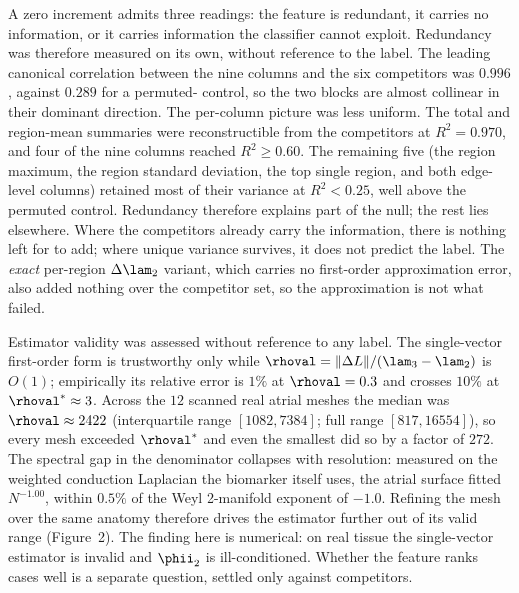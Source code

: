 A zero increment admits three readings: the feature is redundant, it carries no
information, or it carries information the classifier cannot exploit. Redundancy
was therefore measured on its own, without reference to the label. The leading canonical
correlation between the nine \SFI{} columns and the six competitors was $0.996$,
against $0.289$ for a permuted-\SFI{} control, so the two blocks are almost
collinear in their dominant direction. The per-column picture was less uniform.
The total and region-mean summaries were reconstructible from the competitors at
$R^{2}=0.970$, and four of the nine columns reached $R^{2}\geq0.60$. The
remaining five (the region maximum, the region standard deviation, the top
single region, and both edge-level columns) retained most of their variance at
$R^{2}<0.25$, well above the permuted control. Redundancy therefore explains
part of the null; the rest lies elsewhere. Where the competitors already carry
the information, there is nothing left for \SFI{} to add; where unique variance
survives, it does not predict the label. The \emph{exact} per-region
$\Delta\lam_2$ variant, which carries no first-order approximation error, also
added nothing over the competitor set, so the approximation is not what failed.

Estimator validity was assessed without reference to any label. The
single-vector first-order form is trustworthy only while
$\rhoval=\lVert\Delta L\rVert/(\lam_3-\lam_2)$ is $O(1)$; empirically its
relative error is $1\%$ at $\rhoval=0.3$ and crosses $10\%$ at
$\rhoval^\ast\approx3$. Across the $12$ scanned real atrial meshes the median was
$\rhoval\approx2422$ (interquartile range $[1082,7384]$; full range
$[817,16554]$), so every mesh exceeded $\rhoval^\ast$ and even the smallest did so
by a factor of $272$. The spectral gap in the denominator collapses with
resolution: measured on the weighted conduction Laplacian the biomarker itself
uses, the atrial surface fitted $N^{-1.00}$, within $0.5\%$ of the Weyl
2-manifold exponent of $-1.0$. Refining the mesh over the same anatomy therefore
drives the estimator further out of its valid range (Figure~2). The finding here
is numerical: on real tissue the single-vector estimator is invalid and
$\phii_2$ is ill-conditioned. Whether the feature ranks cases well is a separate
question, settled only against competitors.

